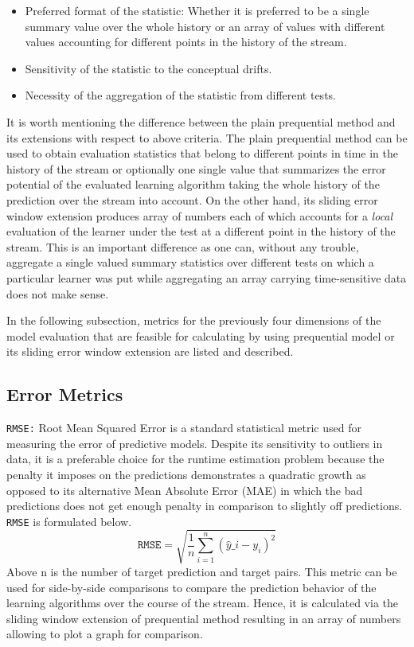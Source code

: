 \begin{itemize}
\item Preferred format of the statistic: Whether it is preferred to be a single summary value over the whole history or an array of values with different values accounting for different points in the history of the stream.
\item Sensitivity of the statistic to the conceptual drifts.
\item Necessity of the aggregation of the statistic from different tests.
\end{itemize}

It is worth mentioning the difference between the plain prequential method and its extensions with respect to above criteria. The plain prequential method can be used to obtain evaluation statistics that belong to different points in time in the history of the stream or optionally one single value that summarizes the error potential of the evaluated learning algorithm taking the whole history of the prediction over the stream into account. On the other hand, its sliding error window extension produces array of numbers each of which accounts for a \textit{local} evaluation of the learner under the test at a different point in the history of the stream. This is an important difference as one can, without any trouble, aggregate a single valued summary statistics over different tests on which a particular learner was put while aggregating an array carrying time-sensitive data does not make sense.

In the following subsection, metrics for the previously four dimensions of the model evaluation that are feasible for calculating by using prequential model or its sliding error window extension are listed and described.

\subsection{Error Metrics}

\texttt{RMSE:} Root Mean Squared Error is a standard statistical metric used for measuring the error of predictive models. Despite its sensitivity to outliers in data, it is a preferable choice for the runtime estimation problem because the penalty it imposes on  the predictions demonstrates a quadratic growth as opposed to its alternative Mean Absolute Error (MAE) in which the bad predictions does not get enough penalty in comparison to slightly off predictions. \texttt{RMSE} is formulated below.
$$\texttt{RMSE}=\sqrt{\frac{1}{n}\sum_{i=1}^{n}(\hat{y}\_i - y_i)^2}$$
Above n is the number of target prediction and target pairs. This metric can be used for side-by-side comparisons to compare the prediction behavior of the learning algorithms over the course of the stream. Hence, it is calculated via the sliding window extension of prequential method resulting in an array of numbers allowing to plot a graph for comparison.

